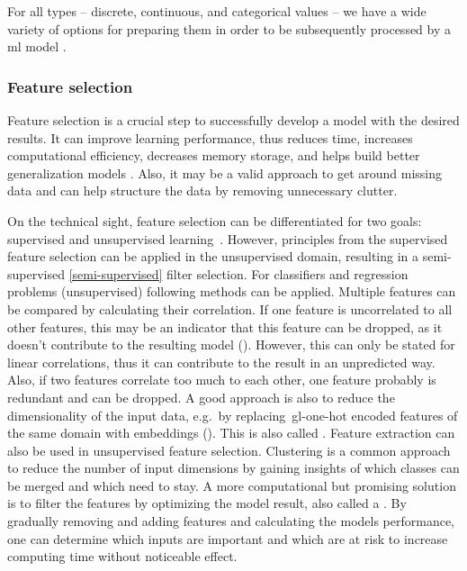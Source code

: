 For all types -- discrete, continuous, and categorical values -- we have a wide variety of options for preparing them in order to be subsequently processed by a \gls{ml} model \cite{duong2021}.


\subsubsection{Feature selection}

Feature selection is a crucial step to successfully develop a model with the desired results.
It can improve learning performance, thus reduces time, increases computational efficiency, decreases memory storage, and helps build better generalization models \cite{li2017feature}.
Also, it may be a valid approach to get around missing data and can help structure the data by removing unnecessary clutter.

On the technical sight, feature selection can be differentiated for two goals: supervised and unsupervised learning~\cite{li2017feature}.
However, principles from the supervised feature selection can be applied in the unsupervised domain, resulting in a semi-supervised \ref{semi-supervised} filter selection.
For classifiers and regression problems (unsupervised) following methods can be applied.
Multiple features can be compared by calculating their correlation.
If one feature is uncorrelated to all other features, this may be an indicator that this feature can be dropped, as it doesn't contribute to the resulting model ().
However, this can only be stated for linear correlations, thus it can contribute to the result in an unpredicted way.
Also, if two features correlate too much to each other, one feature probably is redundant and can be dropped.
A good approach is also to reduce the dimensionality of the input data, e.g.\ by replacing~\gls{gl-one-hot} encoded features of the same domain with embeddings ().
This is also called .
Feature extraction can also be used in unsupervised feature selection.
Clustering is a common approach to reduce the number of input dimensions by gaining insights of which classes can be merged and which need to stay.
A more computational but promising solution is to filter the features by optimizing the model result, also called a .
By gradually removing and adding features and calculating the models performance, one can determine which inputs are important and which are at risk to increase computing time without noticeable effect.

